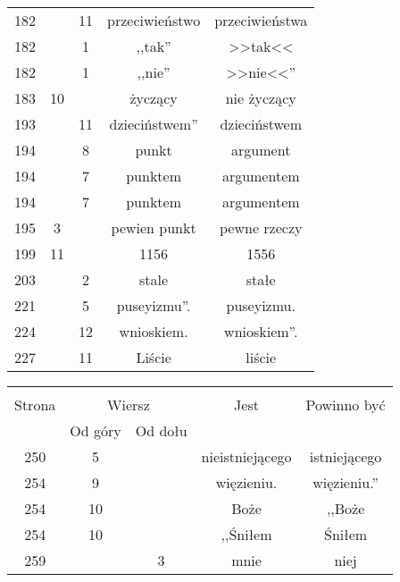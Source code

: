\documentclass[a4paper,11pt]{article}
\begin{document}
\begin{center}
\begin{tabular}{|c|c|c|c|c|}
    182 & & 11 & przeciwieństwo & przeciwieństwa \\
    182 & &  1 & ,,tak'' & >>tak<<  %
    \\
    182 & &  1 & ,,nie'' & >>nie<<''  %
    \\
    183 & 10 & & życzący & nie życzący \\
    193 & & 11 & dzieciństwem'' & dzieciństwem \\
    194 & &  8 & punkt & argument \\
    194 & &  7 & punktem & argumentem \\
    194 & &  7 & punktem & argumentem \\
    195 &  3 & & pewien punkt & pewne rzeczy \\
    199 & 11 & & 1156 & 1556 \\
    203 & &  2 & stale & stałe \\
    221 & &  5 & puseyizmu''. & puseyizmu. \\
    224 & & 12 & wnioskiem. & wnioskiem''. \\
    227 & & 11 & Liście & liście \\
    \hline
  \end{tabular}

  \begin{tabular}{|c|c|c|c|c|}
    \hline
    & \multicolumn{2}{c|}{} & & \\
    Strona & \multicolumn{2}{c|}{Wiersz} & Jest
                              & Powinno być \\ \cline{2-3}
    & Od góry & Od dołu & & \\
    \hline
    250 &  5 & & nieistniejącego & istniejącego \\
    254 &  9 & & więzieniu. & więzieniu.'' \\
    254 & 10 & & Boże & ,,Boże  %
    \\
    254 & 10 & & ,,Śniłem  %
           & Śniłem \\
    259 & &  3 & mnie & niej \\
    \hline
  \end{tabular}
\end{center}
\end{document}
